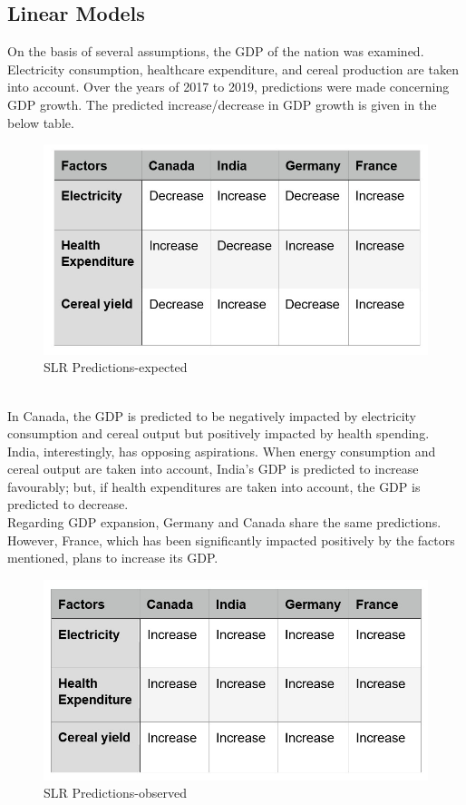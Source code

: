 \documentclass[conference]{IEEEtran}
\begin{document}
\subsection{Linear Models}
On the basis of several assumptions, the GDP of the nation was examined. Electricity consumption, healthcare expenditure, and cereal production are taken into account. Over the years of 2017 to 2019, predictions were made concerning GDP growth. The predicted increase/decrease in GDP growth is given in the below table.\\
\begin{figure}[htbp]
    \centerline{\includegraphics[scale=0.5]{slr.jpg}}
    \caption{SLR Predictions-expected}
\end{figure}
\\
In Canada, the GDP is predicted to be negatively impacted by electricity consumption and cereal output but positively impacted by health spending. India, interestingly, has opposing aspirations. When energy consumption and cereal output are taken into account, India's GDP is predicted to increase favourably; but, if health expenditures are taken into account, the GDP is predicted to decrease.\\
Regarding GDP expansion, Germany and Canada share the same predictions. However, France, which has been significantly impacted positively by the factors mentioned, plans to increase its GDP.
\begin{figure}[htbp]
    \centerline{\includegraphics[scale=0.5]{slr2.jpg}}
    \caption{SLR Predictions-observed}
\end{figure}
\end{document}
